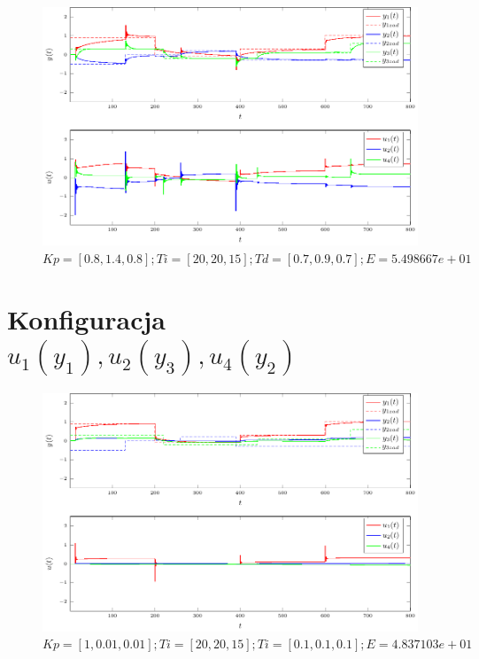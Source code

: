 \documentclass[a4paper,titlepage,11pt,twosides,floatssmall]{mwrep}
\begin{document}
\begin{figure}[H]
	\centering
	\includegraphics[scale=1]{../wykresy/zad4_pid_1_3.pdf}
	\caption{$Kp = [0.8, 1.4, 0.8]; Ti = [20, 20, 15]; Td= [0.7, 0.9, 0.7]; E = 5.498667e+01$}
\end{figure}


\section*{Konfiguracja $u_1(y_1), u_2(y_3), u_4(y_2)$}

\begin{figure}[H]
	\centering
	\includegraphics[scale=1]{../wykresy/zad4_pid_2_1.pdf}
	\caption{$Kp = [1, 0.01, 0.01]; Ti = [20, 20, 15]; Ti = [0.1, 0.1, 0.1]; E = 4.837103e+01$}
\end{figure}
\end{document}
